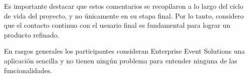 Es importante destacar que estos comentarios se recopilaron a lo largo del ciclo de vida del proyecto, y no únicamente en su etapa final.
Por lo tanto, considero que el contacto continuo con el usuario final es fundamental para lograr un producto refinado.


En rasgos generales los participantes consideran Enterprise Event Solutions una aplicación sencilla y no tienen ningún problema para entender ninguna de las
funcionalidades.
